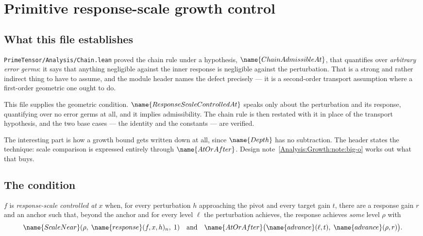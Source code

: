 
\section{Primitive response-scale growth control}
\label{Analysis:Growth:sec}


\subsection*{What this file establishes}

\texttt{PrimeTensor/Analysis/Chain.lean} proved the chain rule under a
hypothesis, $\name{ChainAdmissibleAt}$, that quantifies over \emph{arbitrary
error germs}: it says that anything negligible against the inner response is
negligible against the perturbation.  That is a strong and rather indirect
thing to have to assume, and the module header names the defect precisely --- it
is a second-order transport assumption where a first-order geometric one ought
to do.

This file supplies the geometric condition.  $\name{ResponseScaleControlledAt}$
speaks only about the perturbation and its response, quantifying over no error
germs at all, and it implies admissibility.  The chain rule is then restated
with it in place of the transport hypothesis, and the two base cases --- the
identity and the constants --- are verified.

The interesting part is how a growth bound gets written down at all, since
$\name{Depth}$ has no subtraction.  The header states the technique: scale
comparison is expressed entirely through $\name{AtOrAfter}$.
Design note~\ref{Analysis:Growth:note:big-o} works out what that buys.

\subsection{The condition}

\begin{definition}
\label{Analysis:Growth:def:rsc}
$f$ is \emph{response-scale controlled at} $x$ when, for every perturbation $h$
approaching the pivot and every target gain $t$, there are a response gain $r$
and an anchor such that, beyond the anchor and for every level $\ell$ the
perturbation achieves, the response achieves \emph{some} level $\rho$ with
\[
  \name{ScaleNear}(\rho,\; \name{response}(f,x,h)_n,\; 1)
  \quad\text{and}\quad
  \name{AtOrAfter}\bigl(\name{advance}(\ell,t),\; \name{advance}(\rho,r)\bigr).
\]
\end{definition}

